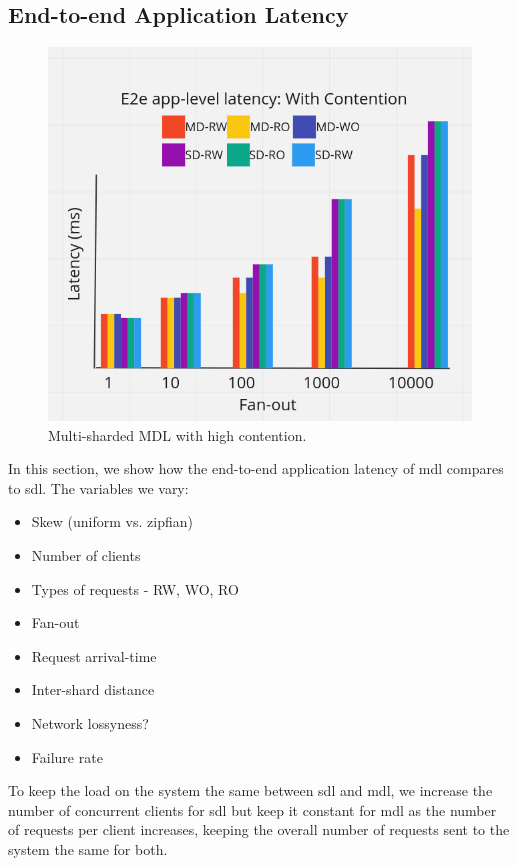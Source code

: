 \subsection{End-to-end Application Latency}
\begin{figure}[!htb]
\includegraphics[scale=.32]{e2e-with-contention.png}
\caption{Multi-sharded MDL with high contention.}
\label{fig:e2e-contention}
\end{figure}
In this section, we show how the end-to-end application latency of mdl compares to sdl.
The variables we vary:
\begin{itemize}
    \item Skew (uniform vs. zipfian)
    \item Number of clients
    \item Types of requests - RW, WO, RO
    \item Fan-out
    \item Request arrival-time
    \item Inter-shard distance
    \item Network lossyness?
    \item Failure rate
\end{itemize}
To keep the load on the system the same between sdl and mdl, we increase the number of concurrent clients for sdl but keep it constant for mdl as the number of requests per client increases, keeping the overall number of requests sent to the system the same for both.

